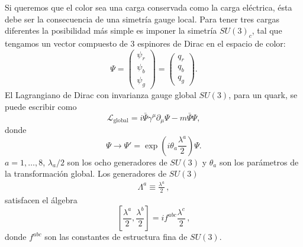 Si queremos que el color sea una carga conservada como la carga eléctrica, ésta debe ser la consecuencia de una simetría gauge local. Para tener tres cargas diferentes la posibilidad más simple es imponer la simetría $SU(3)_c$, tal que tengamos un vector compuesto de 3 espinores de Dirac en el espacio de color:
\begin{equation}
  \Psi=
  \begin{pmatrix}
    \psi_r\\
    \psi_b\\
    \psi_g
  \end{pmatrix}
  =
  \begin{pmatrix}
    q_r\\
    q_b\\
    q_g
  \end{pmatrix}.
\end{equation}
El Lagrangiano de Dirac con invarianza gauge global $SU(3)$, para un quark, se puede escribir como
\begin{equation}
  \label{eq:128qft}
  \mathcal{L}_{\text{global}}=i\bar{\Psi}\gamma^\mu\partial_\mu\Psi-m\bar{\Psi}\Psi,
\end{equation}
donde
\begin{equation}
  \Psi\to \Psi'=\exp\left(i\theta_a\frac{\lambda^a}{2}\right)\Psi.
\end{equation}
$a=1,\ldots,8$, $\lambda_a/2$ son los ocho generadores de $SU(3)$ y $\theta_a$ son los parámetros de la transformación global. Los generadores de $SU(3)$
\begin{align}
  \Lambda^a\equiv\frac{\lambda^a}{2}\,,
\end{align}
satisfacen el álgebra
\begin{equation}
  \left[\frac{\lambda^a}{2},\frac{\lambda^b}{2}\right]=if^{abc}\frac{\lambda^c}{2}\,,
\end{equation}
donde $f^{abc}$ son las constantes de estructura fina de $SU(3)$.

